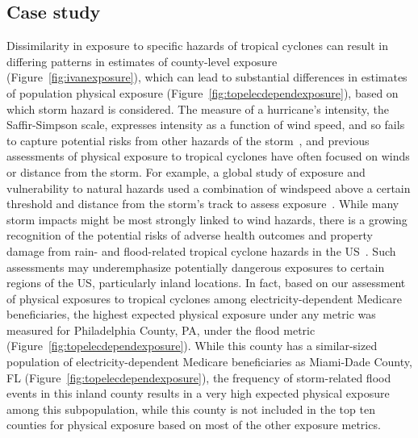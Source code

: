 \begin{comment}
The use of a single hazard-based metric (e.g., wind) could cause similar
problems if the impact is driven, at least in part, by a different hazard or by
multiple hazards of the tropical cyclone.
\end{comment}

\subsection*{Case study}

Dissimilarity in exposure to specific hazards of tropical cyclones can result
in differing patterns in estimates of county-level exposure
(Figure~\ref{fig:ivanexposure}), which can lead to substantial differences
in estimates of population physical exposure
(Figure~\ref{fig:topelecdependexposure}), based on which storm hazard is
considered. The measure of a hurricane's intensity, the Saffir-Simpson scale,
expresses intensity as a function of wind speed, and so fails to capture
potential risks from other hazards of the storm~\parencite{smith2009}, and
previous assessments of physical exposure to tropical cyclones have often
focused on winds or distance from the storm. For example, a global study of
exposure and vulnerability to natural hazards used a combination of windspeed
above a certain threshold and distance from the storm's track to assess
exposure~\parencite{peduzzi2009assessing}. While many storm impacts might be
most strongly linked to wind hazards, there is a growing recognition of the
potential risks of adverse health outcomes and property damage from rain- and
flood-related tropical cyclone hazards in the \ac{US}~\parencite{smith2009}.
Such assessments may underemphasize potentially dangerous exposures to certain
regions of the \ac{US}, particularly inland locations. In fact, based on our
assessment of physical exposures to tropical cyclones among
electricity-dependent Medicare beneficiaries, the highest expected physical
exposure under any metric was measured for Philadelphia County, PA, under the
flood metric (Figure~\ref{fig:topelecdependexposure}).  While this county has a
similar-sized population of electricity-dependent Medicare beneficiaries as
Miami-Dade County, FL (Figure~\ref{fig:topelecdependexposure}), the frequency
of storm-related flood events in this inland county results in a very high
expected physical exposure among this subpopulation, while this county is not
included in the top ten counties for physical exposure based on most of the
other exposure metrics.

